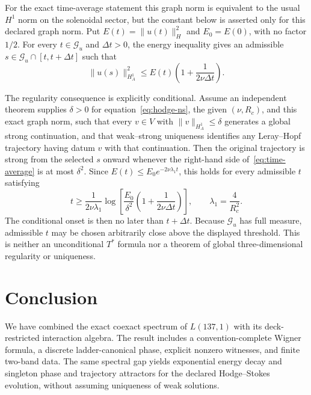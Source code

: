 \documentclass[12pt]{article}
\theoremstyle{definition}
\theoremstyle{remark}
\begin{document}
For the exact time-average statement this graph norm is equivalent to the
usual $H^1$ norm on the solenoidal sector, but the
constant below is asserted only for this declared graph norm.  Put
$E(t)=\|u(t)\|_H^2$ and $E_0=E(0)$, with no factor $1/2$.  For every
$t\in\mathcal G_u$ and $\Delta t>0$, the energy inequality gives an admissible
$s\in\mathcal G_u\cap[t,t+\Delta t]$ such that
\begin{equation}\label{eq:time-average}
 \|u(s)\|_{H_A^1}^2
 \le E(t)\left(1+\frac{1}{2\nu\Delta t}\right).
\end{equation}

The regularity consequence is explicitly conditional.  Assume an independent
theorem supplies $\delta>0$ for equation~\eqref{eq:hodge-ns}, the given
$(\nu,R_c)$, and this exact graph norm, such that every
$v\in V$ with $\|v\|_{H_A^1}\le\delta$ generates a global strong
continuation, and that weak--strong uniqueness identifies any Leray--Hopf
trajectory having datum $v$ with that continuation.  Then the original
trajectory is strong from the selected $s$ onward whenever the right-hand
side of~\eqref{eq:time-average} is at most $\delta^2$.  Since
$E(t)\le E_0e^{-2\nu\lambda_1t}$, this holds for every admissible $t$ satisfying
\begin{equation}\label{eq:conditional-onset}
 t\ge \frac{1}{2\nu\lambda_1}
 \log\!\left[
 \frac{E_0}{\delta^2}
 \left(1+\frac{1}{2\nu\Delta t}\right)
 \right],\qquad \lambda_1=\frac4{R_c^2}.
\end{equation}
The conditional onset is then no later than $t+\Delta t$.  Because
$\mathcal G_u$ has full measure, admissible $t$ may be chosen arbitrarily
close above the displayed threshold.  This is neither an unconditional
$T^*$ formula nor a theorem of global three-dimensional regularity or
uniqueness.

\section{Conclusion}\label{sec:conclusion}

We have combined the exact coexact spectrum of $L(137,1)$ with its
deck-restricted interaction algebra.  The result includes a
convention-complete Wigner formula, a discrete ladder-canonical phase, explicit
nonzero witnesses, and finite two-band data.  The same spectral gap yields
exponential energy decay and singleton phase and trajectory attractors for the
declared Hodge--Stokes evolution, without assuming uniqueness of weak
solutions.
\end{document}
